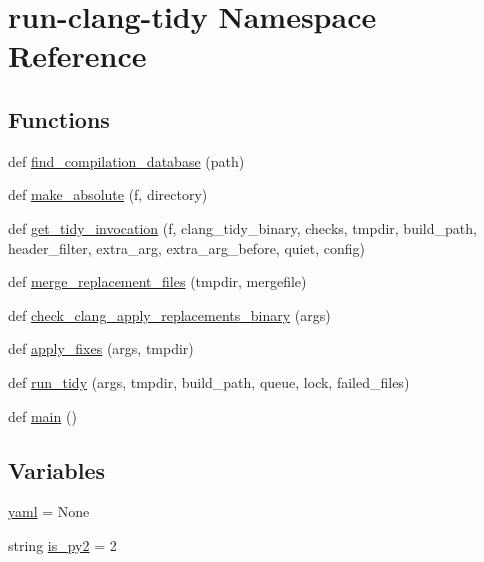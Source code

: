 \hypertarget{namespacerun-clang-tidy}{}\section{run-\/clang-\/tidy Namespace Reference}
\label{namespacerun-clang-tidy}
\subsection*{Functions}
\begin{DoxyCompactItemize}
\item 
def \hyperlink{namespacerun-clang-tidy_a6ac4a700cc424f234d870957b05abb6e}{find\+\_\+compilation\+\_\+database} (path)
\item 
def \hyperlink{namespacerun-clang-tidy_a0cea255a2d9edf0a7f877bd9bdd4c75f}{make\+\_\+absolute} (f, directory)
\item 
def \hyperlink{namespacerun-clang-tidy_a3cbee7957a6ad49d8a88b9c9d74a53dc}{get\+\_\+tidy\+\_\+invocation} (f, clang\+\_\+tidy\+\_\+binary, checks, tmpdir, build\+\_\+path, header\+\_\+filter, extra\+\_\+arg, extra\+\_\+arg\+\_\+before, quiet, config)
\item 
def \hyperlink{namespacerun-clang-tidy_ad3aaf1ecd87ad237a6e5caeeaa4a6ad6}{merge\+\_\+replacement\+\_\+files} (tmpdir, mergefile)
\item 
def \hyperlink{namespacerun-clang-tidy_ac9da9a27018bf1740f1f26c5f7657b7a}{check\+\_\+clang\+\_\+apply\+\_\+replacements\+\_\+binary} (args)
\item 
def \hyperlink{namespacerun-clang-tidy_aae1fd407c48d69133cc1122940aa86ac}{apply\+\_\+fixes} (args, tmpdir)
\item 
def \hyperlink{namespacerun-clang-tidy_a586db901d7ae78f0db162034b23cf68e}{run\+\_\+tidy} (args, tmpdir, build\+\_\+path, queue, lock, failed\+\_\+files)
\item 
def \hyperlink{namespacerun-clang-tidy_a3a4dae083818b9d5c9104e0142e03e3b}{main} ()
\end{DoxyCompactItemize}
\subsection*{Variables}
\begin{DoxyCompactItemize}
\item 
\hyperlink{namespacerun-clang-tidy_ae595381bb97c69bce18d8a2592c5628f}{yaml} = None
\item 
string \hyperlink{namespacerun-clang-tidy_aa041a8caae6885ce927c63a08f77dd83}{is\+\_\+py2} = \textquotesingle{}2\textquotesingle{}
\end{DoxyCompactItemize}


